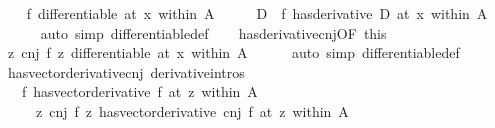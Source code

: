 \begin{isabellebody}
\isamarkupfalse%
\isanewline
\ \ \isamarkupfalse%
\ {\isachardoublequoteopen}f\ differentiable\ at\ x\ within\ A{\isachardoublequoteclose}\isanewline
\ \ \isamarkupfalse%
\ \isamarkupfalse%
\ D\ \ {\isachardoublequoteopen}{\isacharparenleft}{\kern0pt}f\ has{\isacharunderscore}{\kern0pt}derivative\ D{\isacharparenright}{\kern0pt}\ {\isacharparenleft}{\kern0pt}at\ x\ within\ A{\isacharparenright}{\kern0pt}{\isachardoublequoteclose}\isanewline
\ \ \ \ \isamarkupfalse%
\ {\isacharparenleft}{\kern0pt}auto\ simp{\isacharcolon}{\kern0pt}\ differentiable{\isacharunderscore}{\kern0pt}def{\isacharparenright}{\kern0pt}\isanewline
\ \ \isamarkupfalse%
\ has{\isacharunderscore}{\kern0pt}derivative{\isacharunderscore}{\kern0pt}cnj{\isacharbrackleft}{\kern0pt}OF\ this{\isacharbrackright}{\kern0pt}\ \isamarkupfalse%
\ {\isachardoublequoteopen}{\isacharparenleft}{\kern0pt}{\isasymlambda}z{\isachardot}{\kern0pt}\ cnj\ {\isacharparenleft}{\kern0pt}f\ z{\isacharparenright}{\kern0pt}{\isacharparenright}{\kern0pt}\ differentiable\ at\ x\ within\ A{\isachardoublequoteclose}\isanewline
\ \ \ \ \isamarkupfalse%
\ {\isacharparenleft}{\kern0pt}auto\ simp{\isacharcolon}{\kern0pt}\ differentiable{\isacharunderscore}{\kern0pt}def{\isacharparenright}{\kern0pt}\isanewline
{}\isamarkupfalse%
%
\endisatagproof
{\isafoldproof}%
%
\isadelimproof
\isanewline
%
\endisadelimproof
\isanewline
{}\isamarkupfalse%
\ has{\isacharunderscore}{\kern0pt}vector{\isacharunderscore}{\kern0pt}derivative{\isacharunderscore}{\kern0pt}cnj\ {\isacharbrackleft}{\kern0pt}derivative{\isacharunderscore}{\kern0pt}intros{\isacharbrackright}{\kern0pt}{\isacharcolon}{\kern0pt}\isanewline
\ \ \ {\isachardoublequoteopen}{\isacharparenleft}{\kern0pt}f\ has{\isacharunderscore}{\kern0pt}vector{\isacharunderscore}{\kern0pt}derivative\ f{\isacharprime}{\kern0pt}{\isacharparenright}{\kern0pt}\ {\isacharparenleft}{\kern0pt}at\ z\ within\ A{\isacharparenright}{\kern0pt}{\isachardoublequoteclose}\isanewline
\ \ \ \ \ {\isachardoublequoteopen}{\isacharparenleft}{\kern0pt}{\isacharparenleft}{\kern0pt}{\isasymlambda}z{\isachardot}{\kern0pt}\ cnj\ {\isacharparenleft}{\kern0pt}f\ z{\isacharparenright}{\kern0pt}{\isacharparenright}{\kern0pt}\ has{\isacharunderscore}{\kern0pt}vector{\isacharunderscore}{\kern0pt}derivative\ cnj\ f{\isacharprime}{\kern0pt}{\isacharparenright}{\kern0pt}\ {\isacharparenleft}{\kern0pt}at\ z\ within\ A{\isacharparenright}{\kern0pt}{\isachardoublequoteclose}\isanewline

\end{isabellebody}
